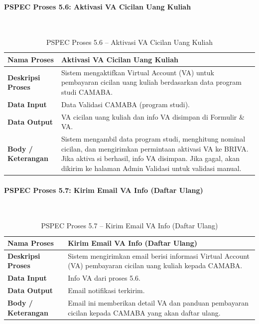 \paragraph{PSPEC Proses 5.6: Aktivasi VA Cicilan Uang Kuliah}~\\
\begin{longtable}{|p{}|p{}|}
	\caption{PSPEC Proses 5.6 -- Aktivasi VA Cicilan Uang Kuliah}
	\label{table:3.pspec56}\\
	\hline
	\textbf{Nama Proses} & Aktivasi VA Cicilan Uang Kuliah \\
	\hline
	\textbf{Deskripsi Proses} & Sistem mengaktifkan Virtual Account (VA) untuk pembayaran cicilan uang kuliah berdasarkan data program studi CAMABA. \\
	\hline
	\textbf{Data Input} & Data Validasi CAMABA (program studi). \\
	\hline
	\textbf{Data Output} & VA cicilan uang kuliah dan info VA disimpan di Formulir \& VA. \\
	\hline
	\textbf{Body / Keterangan} & Sistem mengambil data program studi, menghitung nominal cicilan, dan mengirimkan permintaan aktivasi VA ke BRIVA. Jika aktiva si berhasil, info VA disimpan. Jika gagal, akan dikirim ke halaman Admin Validasi untuk validasi manual. \\
	\hline
\end{longtable}


\paragraph{PSPEC Proses 5.7: Kirim Email VA Info (Daftar Ulang)}~\\
\begin{longtable}{|p{}|p{}|}
	\caption{PSPEC Proses 5.7 -- Kirim Email VA Info (Daftar Ulang)}
	\label{table:3.pspec57}\\
	\hline
	\textbf{Nama Proses} & Kirim Email VA Info (Daftar Ulang) \\
	\hline
	\textbf{Deskripsi Proses} & Sistem mengirimkan email berisi informasi Virtual Account (VA) pembayaran cicilan uang kuliah kepada CAMABA. \\
	\hline
	\textbf{Data Input} & Info VA dari proses 5.6. \\
	\hline
	\textbf{Data Output} & Email notifikasi terkirim. \\
	\hline
	\textbf{Body / Keterangan} & Email ini memberikan detail VA dan panduan pembayaran cicilan kepada CAMABA yang akan daftar ulang. \\
	\hline
\end{longtable}


